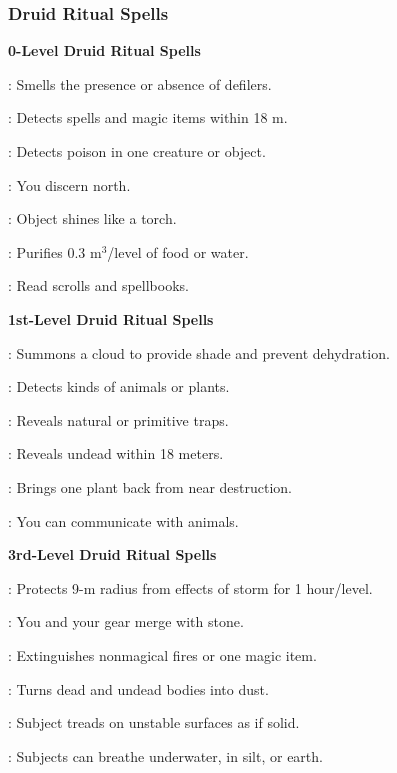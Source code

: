 \subsubsection{Druid Ritual Spells}
\noindent\textbf{0-Level Druid Ritual Spells}
\begin{itemize*}
	\item[] : Smells the presence or absence of defilers.
	\item[] : Detects spells and magic items within 18 m.
	\item[] : Detects poison in one creature or object.
	\item[] : You discern north.
	\item[] : Object shines like a torch.
	\item[] : Purifies 0.3 m$^3$/level of food or water.
	\item[] : Read scrolls and spellbooks.
\end{itemize*}

\noindent\textbf{1st-Level Druid Ritual Spells}
\begin{itemize*}
	\item[] : Summons a cloud to provide shade and prevent dehydration.
	\item[] : Detects kinds of animals or plants.
	\item[] : Reveals natural or primitive traps.
	\item[] : Reveals undead within 18 meters.
	\item[] : Brings one plant back from near destruction.
	\item[] : You can communicate with animals.
\end{itemize*}

\noindent\textbf{3rd-Level Druid Ritual Spells}
\begin{itemize*}
	\item[] : Protects 9-m radius from effects of storm for 1 hour/level.%
	\item[] : You and your gear merge with stone.
	\item[] : Extinguishes nonmagical fires or one magic item.
	\item[] : Turns dead and undead bodies into dust.
	\item[] : Subject treads on unstable surfaces as if solid.
	\item[] : Subjects can breathe underwater, in silt, or earth.
\end{itemize*}

